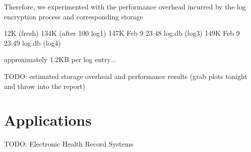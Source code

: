 \documentclass{sig-alternate}
\begin{document}

Therefore, we experimented with the performance overhead incurred by the log encryption process and corresponding storage 

12K (fresh)
134K (after 100 log1)
147K Feb  9 23:48 log.db (log3)
149K Feb  9 23:49 log.db (log4)

approximately 1.2KB per log entry...

TODO: estimated storage overhead and performance results (grab plots tonight and throw into the report)

\section{Applications}
TODO: Electronic Health Record Systems

\balance
\end{document}
